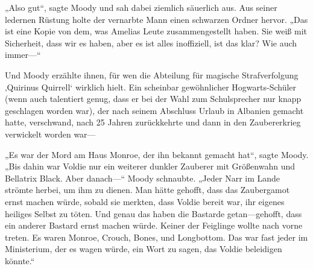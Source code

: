 „Also gut“, sagte Moody und sah dabei ziemlich säuerlich aus. Aus seiner ledernen Rüstung holte der vernarbte Mann einen schwarzen Ordner hervor. „Das ist eine Kopie von dem, was Amelias Leute zusammengestellt haben. Sie weiß mit Sicherheit, dass wir es haben, aber es ist alles inoffiziell, ist das klar? Wie auch immer—“

Und Moody erzählte ihnen, für wen die Abteilung für magische Strafverfolgung ‚Quirinus Quirrell‘ wirklich hielt. Ein scheinbar gewöhnlicher Hogwarts-Schüler (wenn auch talentiert genug, dass er bei der Wahl zum Schulsprecher nur knapp geschlagen worden war), der nach seinem Abschluss Urlaub in Albanien gemacht hatte, verschwand, nach 25 Jahren zurückkehrte und dann in den Zaubererkrieg verwickelt worden war—

„Es war der Mord am Haus Monroe, der ihn bekannt gemacht hat“, sagte Moody. „Bis dahin war Voldie nur ein weiterer dunkler Zauberer mit Größenwahn und Bellatrix Black. Aber danach—“ Moody schnaubte. „Jeder Narr im Lande strömte herbei, um ihm zu dienen. Man hätte gehofft, dass das Zaubergamot ernst machen würde, sobald sie merkten, dass Voldie bereit war, ihr eigenes heiliges Selbst zu töten. Und genau das haben die Bastarde getan—gehofft, dass ein anderer Bastard ernst machen würde. Keiner der Feiglinge wollte nach vorne treten. Es waren Monroe, Crouch, Bones, und Longbottom. Das war fast jeder im Ministerium, der es wagen würde, ein Wort zu sagen, das Voldie beleidigen könnte.“

